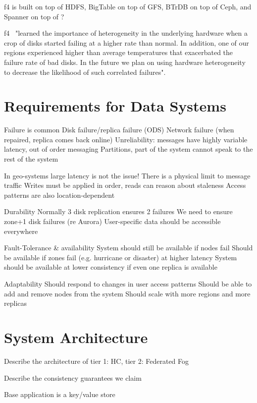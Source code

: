 f4 is built on top of HDFS, BigTable on top of GFS, BTrDB on top of Ceph, and Spanner on top of ?


f4~\cite{f4} "learned the importance of heterogeneity in the underlying hardware when a crop of disks started failing at a higher rate than normal. In addition, one of our regions experienced higher than average temperatures that exacerbated the failure rate of bad disks. In the future we plan on using hardware heterogeneity to decrease the likelihood of such correlated failures".


\section{Requirements for Data Systems}

Failure is common
    Disk failure/replica failure (ODS)
    Network failure (when repaired, replica comes back online)
    Unreliability: messages have highly variable latency, out of order messaging
    Partitions, part of the system cannot speak to the rest of the system

In geo-systems large latency is not the issue!
    There is a physical limit to message traffic
    Writes must be applied in order, reads can reason about staleness
    Access patterns are also location-dependent

Durability
    Normally 3 disk replication ensures 2 failures
    We need to ensure zone+1 disk failures (re Aurora)
    User-specific data should be accessible everywhere

Fault-Tolerance \& availability
    System should still be available if nodes fail
    Should be available if zones fail (e.g. hurricane or disaster) at higher latency
    System should be available at lower consistency if even one replica is available

Adaptability
    Should respond to changes in user access patterns
    Should be able to add and remove nodes from the system
    Should scale with more regions and more replicas

\section{System Architecture}

Describe the architecture of tier 1: HC, tier 2: Federated Fog

Describe the consistency guarantees we claim

Base application is a key/value store

